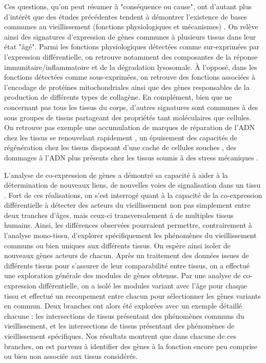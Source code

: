 Ces questions, qu'on peut résumer à "conséquence ou cause", ont d'autant plus d'intérêt que des études précédentes tendent à démontrer l'existence de bases communes au vieillissement (fonctions physiologiques et mécanismes) . On relève ainsi des signatures d'expression de gènes communes à plusieurs tissus dans leur état "âgé". Parmi les fonctions physiologiques détectées comme sur-exprimées par l'expression différentielle, on retrouve notamment des composantes de la réponse immunitaire/inflammatoire et de la dégradation lysosomale. À l'opposé, dans les fonctions détectées comme sous-exprimées, on retrouve des fonctions associées à l'encodage de protéines mitochondriales ainsi que des gènes responsables de la production de différents types de collagène. En complément, bien que ne concernant pas tous les tissus du corps, d'autres signatures sont communes à des sous groupes de tissus partageant des propriétés tant moléculaires que cellules. On retrouve pas exemple une accumulation de marques de réparation de l'ADN chez les tissus se renouvelant rapidement , un épuisement des capacités de régénération chez les tissus disposant d'une cache de cellules souches , des dommages à l'ADN plus présents chez les tissus soumis à des stress mécaniques .

L'analyse de co-expression de gènes a démontré sa capacité à aider à la détermination de nouveaux liens, de nouvelles voies de signalisation dans un tissu . 
Fort de ces réalisations, on s'est interrogé quant à la capacité de la co-expression différentielle à détecter des acteurs du vieillissement non pas simplement entre deux tranches d'âges, mais ceux-ci transversalement à de multiples tissus humains. 
Ainsi, les différences observées pourraient permettre, contrairement à l'analyse mono-tissu, d'explorer spécifiquement les phénomènes du vieillissement communs ou bien uniques aux différents tissus. On espère ainsi isoler de nouveaux gènes acteurs de chacun.
Après un traitement des données issues de différents tissus pour s'assurer de leur comparabilité entre tissus, on a effectué une exploration générale des modules de gènes obtenus. Par une analyse de co-expression différentielle, on a isolé les modules variant avec l'âge pour chaque tissu et effectué un recoupement entre chacun pour sélectionner les gènes variants en commun. Deux branches ont alors été explorées avec un exemple détaillé chacune : les intersections de tissus présentant des phénomènes communs du vieillissement, et les intersections de tissus présentant des phénomènes de vieillissement spécifiques. Nos résultats montrent que dans chacune de ces branches, on est parvenu à identifier des gènes à la fonction encore peu comprise ou bien non associée aux tissus considérés.

